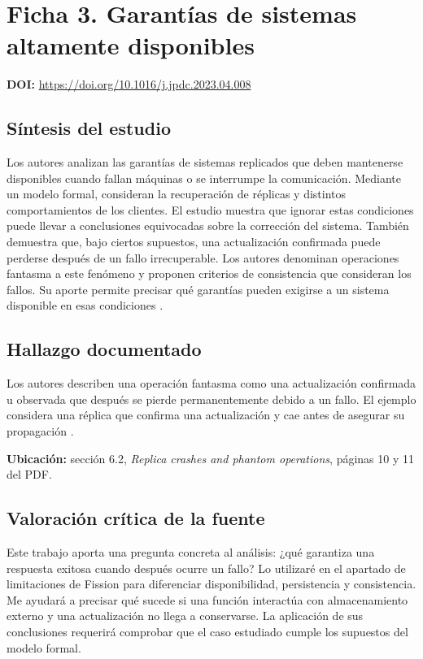 \documentclass[11pt,a4paper]{article}
\newcommand{\tituloficha}[1]{\Needspace{5\baselineskip}\section*{#1}}
\newcommand{\doificha}[1]{\textbf{DOI:} \url{https://doi.org/#1}\par}
\begin{document}
\clearpage

\tituloficha{Ficha 3. Garantías de sistemas altamente disponibles}

\doificha{10.1016/j.jpdc.2023.04.008}

\subsection*{Síntesis del estudio}

Los autores analizan las garantías de sistemas replicados que deben
mantenerse disponibles cuando fallan máquinas o se interrumpe la
comunicación. Mediante un modelo formal, consideran la recuperación de
réplicas y distintos comportamientos de los clientes. El estudio muestra que
ignorar estas condiciones puede llevar a conclusiones equivocadas sobre la
corrección del sistema. También demuestra que, bajo ciertos supuestos, una
actualización confirmada puede perderse después de un fallo irrecuperable.
Los autores denominan operaciones fantasma a este fenómeno y proponen
criterios de consistencia que consideran los fallos. Su aporte permite
precisar qué garantías pueden exigirse a un sistema disponible en esas
condiciones
\cite{kokocinski_correctness_2023}.

\subsection*{Hallazgo documentado}

Los autores describen una operación fantasma como una
actualización confirmada u observada que después se pierde
permanentemente debido a un fallo. El ejemplo considera
una réplica que confirma una actualización y cae antes
de asegurar su propagación
\cite{kokocinski_correctness_2023}.

\textbf{Ubicación:} sección 6.2,
\textit{Replica crashes and phantom operations}, páginas 10 y 11 del PDF.

\subsection*{Valoración crítica de la fuente}

Este trabajo aporta una pregunta concreta al análisis: ¿qué garantiza una
respuesta exitosa cuando después ocurre un fallo? Lo utilizaré en el
apartado de limitaciones de Fission para diferenciar disponibilidad,
persistencia y consistencia. Me ayudará a precisar qué sucede si una función
interactúa con almacenamiento externo y una actualización no llega a
conservarse. La aplicación de sus conclusiones requerirá comprobar que el
caso estudiado cumple los supuestos del modelo formal.
\end{document}
